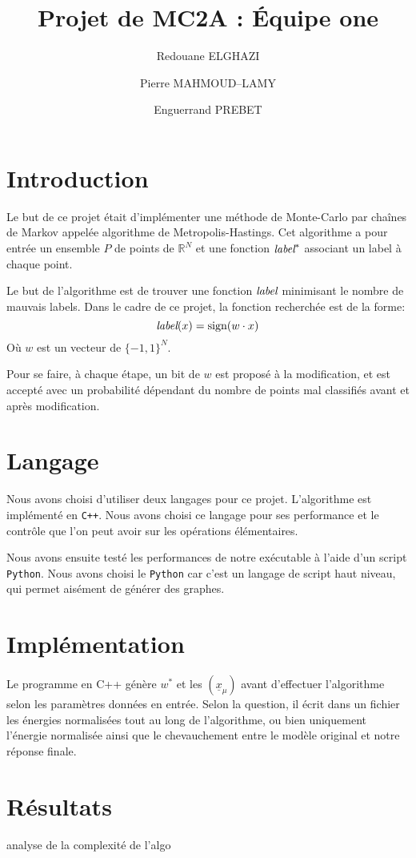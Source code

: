\documentclass[twocolumn]{article}
\date{}
\author{Redouane ELGHAZI \and Pierre MAHMOUD--LAMY \and Enguerrand PREBET}
\title{Projet de MC2A : Équipe one}
\begin{document}
	\maketitle
	\section{Introduction}
		Le but de ce projet était d'implémenter une méthode de Monte-Carlo par chaînes de Markov appelée algorithme de Metropolis-Hastings. Cet algorithme a pour entrée un ensemble $P$ de points de $\mathbb{R}^N$ et une fonction $\emph{label}^*$ associant un label à chaque point.
		
		Le but de l'algorithme est de trouver une fonction $\emph{label}$ minimisant le nombre de mauvais labels. Dans le cadre de ce projet, la fonction recherchée est de la forme:
		$$\emph{label}(x) = \text{sign}(w\cdot x)$$
		Où $w$ est un vecteur de $\big\{{-1},1\big\}^N$.
		 
		Pour se faire, à chaque étape, un bit de $w$ est proposé à la modification, et est accepté avec un probabilité dépendant du nombre de points mal classifiés avant et après modification.
	\section{Langage}
		Nous avons choisi d'utiliser deux langages pour ce projet. L'algorithme est implémenté en \verb!C++!. Nous avons choisi ce langage pour ses performance et le contrôle que l'on peut avoir sur les opérations élémentaires.
		
		Nous avons ensuite testé les performances de notre exécutable à l'aide d'un script \verb!Python!. Nous avons choisi le \verb!Python! car c'est un langage de script haut niveau, qui permet aisément de générer des graphes.
		
	\section{Implémentation}
		Le programme en C++ génère $w^*$ et les $(\underline{x}_\mu)$ avant d'effectuer l'algorithme selon les paramètres données en entrée. Selon la question, il écrit dans un fichier les énergies normalisées tout au long de l'algorithme, ou bien uniquement l'énergie normalisée ainsi que le chevauchement entre le modèle original et notre réponse finale. 
	\section{Résultats}
		analyse de la complexité de l'algo
		
\end{document}
